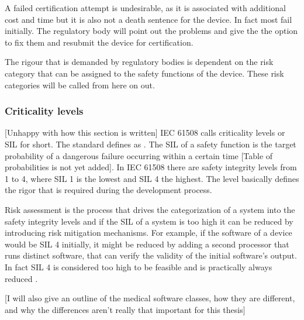 A failed certification attempt is undesirable, as it is associated with additional cost and time but it is also not a death sentence for the device. In fact most fail initially. The regulatory body will point out the problems and give the \mfg{} the option to fix them and resubmit the device for certification.

The rigour that is demanded by regulatory bodies is dependent on the risk category that can be assigned to the safety functions of the device. These risk categories will be called  from here on out. 

\subsubsection{Criticality levels}
[Unhappy with how this section is written]
IEC 61508 calls criticality levels  or  \gls{SIL} for short. The standard defines  as \cite{IEC.2010-1}. The SIL of a safety function is the target probability of a dangerous failure occurring within a certain time [Table of probabilities is not yet added]. In IEC 61508 there are safety integrity levels from 1 to 4, where SIL 1 is the lowest and SIL 4 the highest. The level basically defines the rigor that is required during the development process.

Risk assessment is the process that drives the categorization of a system into the safety integrity levels and if the SIL of a system is too high it can be reduced by introducing risk mitigation mechanisms. For example, if the software of a device would be SIL 4 initially, it might be reduced by adding a second processor that runs distinct software, that can verify the validity of the initial software's output.  In fact SIL 4 is considered too high to be feasible and is practically always reduced \cite{MTLInstrumentsGroup.March2002}.

[I will also give an outline of the medical software classes, how they are different, and why the differences aren't really that important for this thesis]

